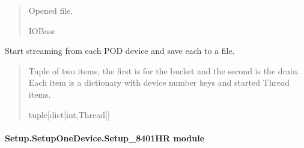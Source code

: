 \documentclass[letterpaper,10pt,english]{sphinxmanual}
\begin{document}
\begin{fulllineitems}
\begin{fulllineitems}
\begin{quote}
\begin{description}
\sphinxAtStartPar
Opened file.

\sphinxAtStartPar
IOBase

\end{description}\end{quote}

\end{fulllineitems}


\begin{fulllineitems}
\label{\detokenize{Setup.SetupOneDevice:Setup.SetupOneDevice.Setup_8274D.Setup8274D._StreamThreading}}
\pysigstartsignatures
{}
\pysigstopsignatures
\sphinxAtStartPar
Start streaming from each POD device and save each to a file.
\begin{quote}\begin{description}
\sphinxAtStartPar
Tuple of two items, the first is for the bucket and the second is the drain.                 Each item is a dictionary with device number keys and started Thread items.

\sphinxAtStartPar
tuple{[}dict{[}int,Thread{]}{]}

\end{description}\end{quote}

\end{fulllineitems}


\end{fulllineitems}



\paragraph{Setup.SetupOneDevice.Setup\_8401HR module}
\label{\detokenize{Setup.SetupOneDevice:module-Setup.SetupOneDevice.Setup_8401HR}}\label{\detokenize{Setup.SetupOneDevice:setup-setuponedevice-setup-8401hr-module}}
\end{document}
